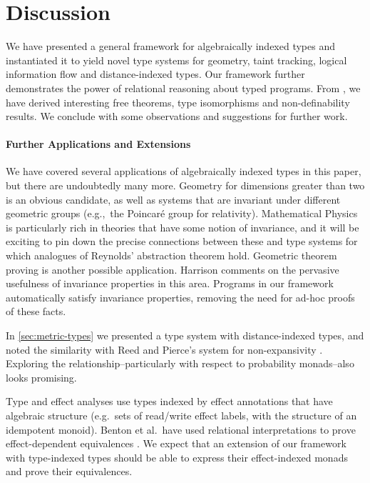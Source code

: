 \section{Discussion}
\label{sec:discussion}

We have presented a general framework for algebraically indexed types
and instantiated it to yield novel type systems for geometry, taint
tracking, logical information flow and distance-indexed types. Our
framework further demonstrates the power of relational reasoning about
typed programs. From , we have derived
interesting free theorems, type isomorphisms and non-definability
results. We conclude with some observations and suggestions for
further work.

\paragraph{Further Applications and Extensions} We have covered
several applications of algebraically indexed types in this paper, but
there are undoubtedly many more. Geometry for dimensions greater than
two is an obvious candidate, as well as systems that are invariant
under different geometric groups (e.g.,~the Poincar\'{e} group for
relativity). Mathematical Physics is particularly rich in theories
that have some notion of invariance, and it will be exciting to pin
down the precise connections between these and type systems for which
analogues of Reynolds' abstraction theorem hold. Geometric theorem
proving is another possible application. Harrison
\cite{harrison09without} comments on the pervasive usefulness of
invariance properties in this area. Programs in our framework
automatically satisfy invariance properties, removing the need for
ad-hoc proofs of these facts.

In \autoref{sec:metric-types} we presented a type system with
distance-indexed types, and noted the similarity with Reed and
Pierce's system for non-expansivity \cite{reed10distance}. Exploring
the relationship--particularly with respect to probability
monads--also looks promising.

Type and effect analyses use types indexed by effect annotations that
have algebraic structure (e.g.~sets of read/write effect labels, with
the structure of an idempotent monoid). Benton et al.~have used
relational interpretations to prove effect-dependent equivalences
\cite{benton06reading}. We expect that an extension of our framework
with type-indexed types should be able to express their effect-indexed
monads and prove their equivalences.


